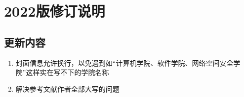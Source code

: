 \section{2022版修订说明}

\subsection{更新内容}

\begin{enumerate}[1、]
    \item 封面信息允许换行，以免遇到如“计算机学院、软件学院、网络空间安全学院”这样实在写不下的学院名称
    \item 解决参考文献作者全部大写的问题
\end{enumerate}

